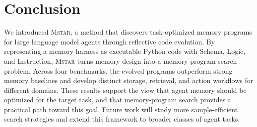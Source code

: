 \documentclass{article}
\newcommand{\sysname}{\textsc{Mstar}}
\begin{document}













\section{Conclusion}

We introduced \sysname{}, a method that discovers task-optimized memory programs for large language model agents through reflective code evolution.
By representing a memory harness as executable Python code with Schema, Logic, and Instruction, \sysname{} turns memory design into a memory-program search problem.
Across four benchmarks, the evolved programs outperform strong memory baselines and develop distinct storage, retrieval, and action workflows for different domains.
These results support the view that agent memory should be optimized for the target task, and that memory-program search provides a practical path toward this goal.
Future work will study more sample-efficient search strategies and extend this framework to broader classes of agent tasks.






\clearpage

\end{document}
